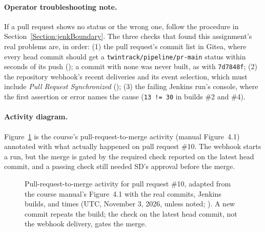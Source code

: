 \paragraph{Operator troubleshooting note.} If a pull request shows no status or the wrong one, follow the procedure in
Section~\ref{Section:jenkBoundary}. The three checks that found this assignment's real problems are, in order: (1) the pull request's
commit list in Gitea, where every head commit should get a \texttt{twintrack/pipeline/pr-main} status within seconds of its push
(); a commit with none was never built, as with \texttt{7d7848f}; (2) the repository webhook's recent deliveries and its event
selection, which must include \emph{Pull Request Synchronized} (); (3) the failing Jenkins run's console, where the first
assertion or error names the cause (\texttt{13 != 30} in builds \#2 and \#4).

\paragraph{Activity diagram.} Figure~\ref{Figure:JenkinsActivity} is the course's pull-request-to-merge activity
(manual Figure~4.1) annotated with what actually happened on pull request \#10. The webhook starts a run, but the merge is gated by
the required check reported on the latest head commit, and a passing check still needed SD's approval before the merge.

\begin{figure}[htbp]
\centering
\resizebox{0.95\linewidth}{!}{}
\caption{Pull-request-to-merge activity for pull request \#10, adapted from the course manual's Figure~4.1 \cite{DosManual} with the real
commits, Jenkins builds, and times (UTC, November 3, 2026, unless noted; ). A new commit repeats the build; the check on the
latest head commit, not the webhook delivery, gates the merge.}
\label{Figure:JenkinsActivity}
\end{figure}

